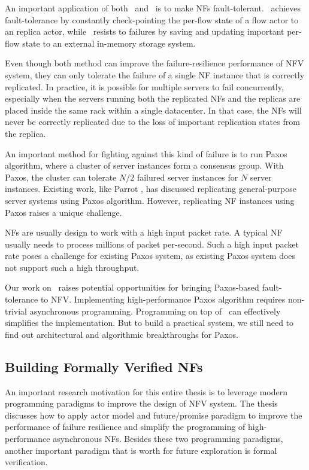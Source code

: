 An important application of both \nfactor~and \netstar~is to make NFs fault-tolerant. \nfactor~achieves fault-tolerance by constantly check-pointing the per-flow state of a flow actor to an replica actor, while \netstar~resists to failures by saving and updating important per-flow state to an external in-memory storage system.

Even though both method can improve the failure-resilience performance of NFV system, they can only tolerate the failure of a single NF instance that is correctly replicated. In practice, it is possible for multiple servers to fail concurrently, especially when the servers running both the replicated NFs and the replicas are placed inside the same rack within a single datacenter. In that case, the NFs will never be correctly replicated due to the loss of important replication states from the replica.

An important method for fighting against this kind of failure is to run Paxos algorithm, where a cluster of server instances form a consensus group. With Paxos, the cluster can tolerate $N/2$ failured server instances for $N$ server instances. Existing work, like Parrot \cite{}, has discussed replicating general-purpose server systems using Paxos algorithm. However, replicating NF instances using Paxos raises a unique challenge.

NFs are usually design to work with a high input packet rate. A typical NF usually needs to process millions of packet per-second. Such a high input packet rate poses a challenge for existing Paxos system, as existing Paxos system does not support such a high throughput.

Our work on \netstar~raises potential opportunities for bringing Paxos-based fault-tolerance to NFV. Implementing high-performance Paxos algorithm requires non-trivial asynchronous programming. Programming on top of \netstar~can effectively simplifies the implementation. But to build a practical system, we still need to find out architectural and algorithmic breakthroughs for Paxos.

\subsection{Building Formally Verified NFs}

An important research motivation for this entire thesis is to leverage modern programming paradigms to improve the design of NFV system. The thesis discusses how to apply actor model and future/promise paradigm to improve the performance of failure resilience and simplify the programming of high-performance asynchronous NFs. Besides these two programming paradigms, another important paradigm that is worth for future exploration is formal verification.

